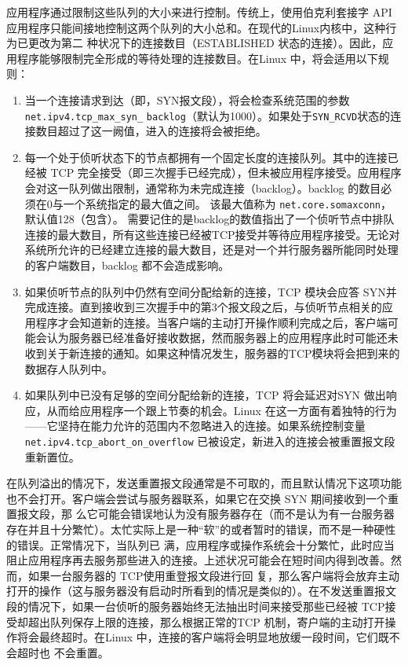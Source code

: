 应用程序通过限制这些队列的大小来进行控制。传统上，使用伯克利套接字 API
应用程序只能间接地控制这两个队列的大小总和。在现代的Linux内核中，这种行为已更改为第二
种状况下的连接数目（ESTABLISHED 状态的连接）。因此，应用程序能够限制完全形成的等待处理的连接数目。在Linux 中，将会适用以下规则：
\begin{enumerate}
  \item 当一个连接请求到达（即，SYN报文段），将会检查系统范围的参数
    \verb|net.ipv4.tcp_max_syn_|
    \verb|backlog|（默认为1000）。如果处于\verb|SYN_RCVD|状态的连接数目超过了这一阙值，进入的连接将会被拒绝。
  \item 每一个处于侦听状态下的节点都拥有一个固定长度的连接队列。其中的连接已经被 TCP
    完全接受（即三次握手已经完成），但未被应用程序接受。应用程序会对这一队列做出限制，通常称为未完成连接（backlog）。backlog
    的数目必须在0与一个系统指定的最大值之间。
    该最大值称为 \verb|net.core.somaxconn|，默认值128（包含）。
    需要记住的是backlog的数值指出了一个侦听节点中排队连接的最大数目，所有这些连接已经被TCP接受并等待应用程序接受。无论对系统所允许的已经建立连接的最大数目，还是对一个并行服务器所能同时处理的客户端数目，backlog
    都不会造成影响。
  \item 如果侦听节点的队列中仍然有空间分配给新的连接，TCP 模块会应答
    SYN并完成连接。直到接收到三次握手中的第3个报文段之后，与侦听节点相关的应用程序才会知道新的连接。当客户端的主动打开操作顺利完成之后，客户端可能会认为服务器已经准备好接收数据，然而服务器上的应用程序此时可能还未收到关于新连接的通知。如果这种情况发生，服务器的TCP模块将会把到来的数据存人队列中。
  \item 如果队列中已没有足够的空间分配给新的连接，TCP 将会延迟对SYN
    做出响应，从而给应用程序一个跟上节奏的机会。Linux
    在这一方面有着独特的行为——它坚持在能力允许的范围内不忽略进入的连接。如果系统控制变量
    \verb|net.ipv4.tcp_abort_on_overflow| 已被设定，新进入的连接会被重置报文段重新置位。
\end{enumerate}

在队列溢出的情况下，发送重置报文段通常是不可取的，而且默认情况下这项功能也不会打开。客户端会尝试与服务器联系，如果它在交换 SYN 期间接收到一个重置报文段，那
么它可能会错误地认为没有服务器存在（而不是认为有一台服务器存在并且十分繁忙）。太忙实际上是一种“软”的或者暂时的错误，而不是一种硬性的错误。正常情况下，当队列已
满，应用程序或操作系统会十分繁忙，此时应当阻止应用程序再去服务那些进入的连接。上述状况可能会在短时间内得到改善。然而，如果一台服务器的
TCP使用重登报文段进行回
复，那么客户端将会放弃主动打开的操作（这与服务器没有启动时所看到的情况是类似的）。在不发送重置报文段的情况下，如果一台侦听的服务器始终无法抽出时间来接受那些已经被
TCP接受却超出队列保存上限的连接，那么根据正常的TCP 机制，寄户端的主动打开操作将会最终超时。在Linux
中，连接的客户端将会明显地放缓一段时间，它们既不会超时也
不会重置。

